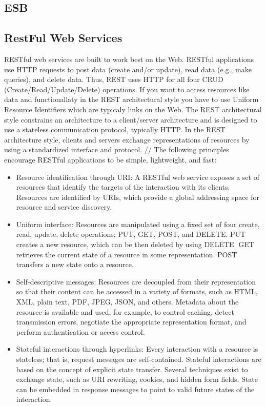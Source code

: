 \documentclass[12pt]{article}
\begin{document}
\subsection{ESB}
\label{sec:esb}
\subsection{RestFul Web Services}
RESTful web services are built to work best on the Web. RESTful applications use HTTP requests to post data (create and/or update), read data (e.g., make queries), and delete data. Thus, REST uses HTTP for all four CRUD (Create/Read/Update/Delete) operations. If you want to access resources like data and functionallaty in the REST architectural style you have to use Uniform Resource Identifiers which are typicaly links 
on the Web. The REST architectural style constrains an architecture to a client/server architecture and is designed to use a stateless communication protocol, typically HTTP. In the REST architecture style, clients and servers exchange representations of resources by using a standardized interface and protocol. //
The following principles encourage RESTful applications to be simple, lightweight, and fast:
\\
\begin{itemize}
\item Resource identification through URI: 
A RESTful web service exposes a set of resources that identify the targets of the interaction with its clients. Resources are identified by URIs, which provide a global addressing space for resource and service discovery.\\
\item Uniform interface: 
Resources are manipulated using a fixed set of four create, read, update, delete operations: PUT, GET, POST, and DELETE. PUT creates a new resource, which can be then deleted by using DELETE. GET retrieves the current state of a resource in some representation. POST transfers a new state onto a resource.\\
\item Self-descriptive messages: 
Resources are decoupled from their representation so that their content can be accessed in a variety of formats, such as HTML, XML, plain text, PDF, JPEG, JSON, and others. Metadata about the resource is available and used, for example, to control caching, detect transmission errors, negotiate the appropriate representation format, and perform authentication or access control. \\
\item Stateful interactions through hyperlinks:
Every interaction with a resource is stateless; that is, request messages are self-contained. Stateful interactions are based on the concept of explicit state transfer. Several techniques exist to exchange state, such as URI rewriting, cookies, and hidden form fields. State can be embedded in response messages to point to valid future states of the interaction.\\
\end{itemize}
\cite{RESTful}
\end{document}
